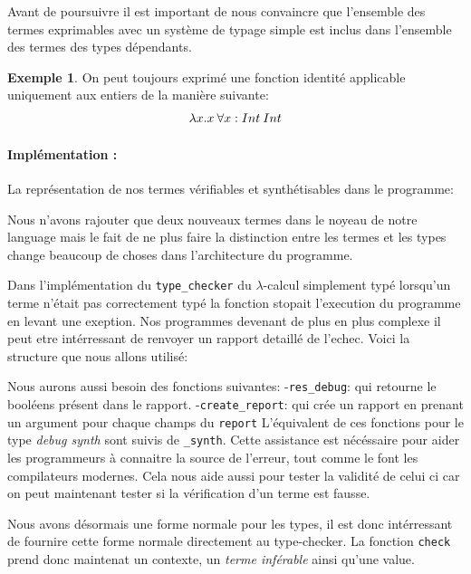 \documentclass {article}
\newcommand{\codefrom}[3]
           {}
\theoremstyle{definition}
\newtheorem{example}{Exemple}
\theoremstyle{remark}
\newcommand{\fun}[1]{\lstinline!#1!}
\begin{document}
Avant de poursuivre il est important de nous convaincre que l'ensemble des termes exprimables avec un système 
de typage simple est inclus dans l'ensemble des termes des types dépendants.
\begin{example}
  On peut toujours exprimé une fonction identité applicable uniquement aux entiers de la manière suivante:
  \begin{align*}
    &\lambda x. x\:\forall x:Int\:Int \\
  \end{align*}
\end{example}

\paragraph{Implémentation :} 
La représentation de nos termes vérifiables et synthétisables dans le programme:
\codefrom{dependent}{lambda}{inTm}
\codefrom{dependent}{lambda}{exTm}

Nous n'avons rajouter que deux nouveaux termes dans le noyeau de notre language mais 
le fait de ne plus faire la distinction entre les termes et les types change beaucoup de
choses dans l'architecture du programme. 

Dans l'implémentation du \fun{type_checker} du $\lambda$-calcul simplement typé lorsqu'un terme n'était pas
correctement typé la fonction stopait l'execution du programme en levant une exeption.
Nos programmes devenant de plus en plus complexe il peut etre intérressant de renvoyer un rapport detaillé
de l'echec. Voici la structure que nous allons utilisé:

\codefrom{dependent}{lambda}{debug}

Nous aurons aussi besoin des fonctions suivantes: 
-\fun{res_debug}: qui retourne le booléens présent dans le rapport.    
-\fun{create_report}: qui crée un rapport en prenant un argument pour chaque champs du \fun{report}
L'équivalent de ces fonctions pour le type \emph{debug synth} sont suivis de \fun{_synth}.
Cette assistance est nécéssaire pour aider les programmeurs à connaitre la source de l'erreur,
tout comme le font les compilateurs modernes. Cela nous aide aussi pour tester la validité de celui 
ci car on peut maintenant tester si la vérification d'un terme est fausse.

Nous avons désormais une forme normale pour les types, il est donc intérressant de 
fournire cette forme normale directement au type-checker. La fonction \fun{check} prend donc maintenat
un contexte, un \emph{terme inférable} ainsi qu'une value.
\end{document}
